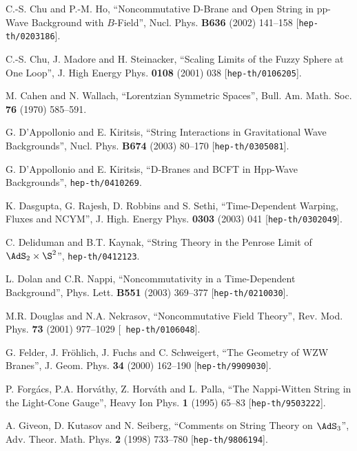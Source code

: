 \begin{thebibliography}{199}
 C.-S. Chu and P.-M. Ho, ``Noncommutative D-Brane and
  Open String in pp-Wave Background with $B$-Field'', Nucl. Phys. {\bf
    B636} (2002) 141--158 [{\tt hep-th/0203186}].

 C.-S. Chu, J. Madore and H. Steinacker, ``Scaling
  Limits of the Fuzzy Sphere at One Loop'', J. High Energy Phys. {\bf
    0108} (2001) 038 [{\tt hep-th/0106205}].

 M. Cahen and N. Wallach, ``Lorentzian Symmetric
  Spaces'', Bull. Am. Math. Soc. {\bf 76} (1970) 585--591.

 G. D'Appollonio and E. Kiritsis, ``String Interactions
  in Gravitational Wave Backgrounds'', Nucl. Phys. {\bf B674} (2003)
  80--170 [{\tt hep-th/0305081}].

 G. D'Appollonio and E. Kiritsis, ``D-Branes and BCFT in
  Hpp-Wave Backgrounds'', {\tt hep-th/0410269}.

 K. Dasgupta, G. Rajesh, D. Robbins and S. Sethi,
  ``Time-Dependent Warping, Fluxes and NCYM'', J. High. Energy
  Phys. {\bf 0303} (2003) 041 [{\tt hep-th/0302049}].

 C. Deliduman and B.T. Kaynak, ``String Theory in the
  Penrose Limit of $\AdS_2\times\S^2$'', {\tt hep-th/0412123}.

 L. Dolan and C.R. Nappi, ``Noncommutativity in a
  Time-Dependent Background'', Phys. Lett. {\bf B551} (2003) 369--377
  [{\tt hep-th/0210030}].

 M.R. Douglas and N.A. Nekrasov, ``Noncommutative Field
  Theory'', Rev. Mod. Phys. {\bf 73} (2001) 977--1029 [{\tt
    hep-th/0106048}].

 G. Felder, J. Fr\"ohlich, J. Fuchs and C. Schweigert,
  ``The Geometry of WZW Branes'', J. Geom. Phys. {\bf 34} (2000)
  162--190 [{\tt hep-th/9909030}].

 P. Forg\'acs, P.A. Horv\'athy, Z. Horv\'ath and L. Palla,
  ``The Nappi-Witten String in the Light-Cone Gauge'', Heavy Ion
  Phys. {\bf 1} (1995) 65--83 [{\tt hep-th/9503222}].

 A. Giveon, D. Kutasov and N. Seiberg, ``Comments on
  String Theory on $\AdS_3$'', Adv. Theor. Math. Phys. {\bf 2} (1998)
  733--780 [{\tt hep-th/9806194}].


\end{thebibliography}
